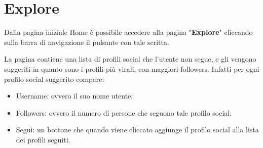 \section{Explore} {
    Dalla pagina iniziale Home è possibile accedere alla pagina "\textbf{Explore}" cliccando sulla barra di navigazione il pulsante con tale scritta.

    La pagina contiene una lista di profili social che l'utente non segue, e gli vengono suggeriti in quanto sono i profili più virali, con maggiori followers.
    Infatti per ogni profilo social suggerito compare:
    \begin{itemize}
        \item Username: ovvero il suo nome utente;
        \item Followers: ovvero il numero di persone che seguono tale profilo social;
        \item Segui: un bottone che quando viene cliccato aggiunge il profilo social alla lista dei profili seguiti.
    \end{itemize}
}
